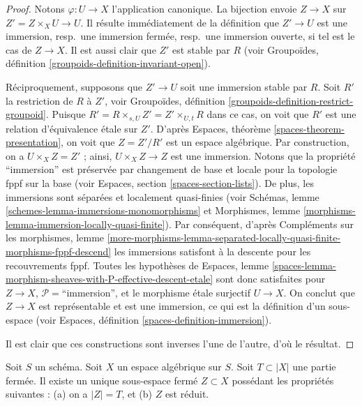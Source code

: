 \begin{proof}
Notons $\varphi : U \to X$ l'application canonique. La bijection envoie
$Z \to X$ sur $Z' = Z \times_X U \to U$. Il résulte immédiatement de la définition
que $Z' \to U$ est une immersion, resp.\ une immersion fermée, resp.\ une
immersion ouverte, si tel est le cas de $Z \to X$. Il est aussi clair que $Z'$ est stable par $R$
(voir Groupoïdes, définition \ref{groupoids-definition-invariant-open}).

\medskip\noindent
Réciproquement, supposons que $Z' \to U$ soit une immersion stable par $R$.
Soit $R'$ la restriction de $R$ à $Z'$, voir
Groupoïdes, définition \ref{groupoids-definition-restrict-groupoid}.
Puisque $R' = R \times_{s, U} Z' = Z' \times_{U, t} R$ dans ce cas,
on voit que $R'$ est une relation d'équivalence \'etale sur $Z'$. D'après
Espaces, théorème \ref{spaces-theorem-presentation}, on voit que
$Z = Z'/R'$ est un espace algébrique. Par construction, on a
$U \times_X Z = Z'$ ; ainsi, $U \times_X Z \to Z$ est une immersion.
Notons que la propriété ``immersion'' est préservée par changement de base
et locale pour la topologie fppf sur la base (voir Espaces, section \ref{spaces-section-lists}).
De plus, les immersions sont séparées et localement quasi-finies (voir
Schémas, lemme \ref{schemes-lemma-immersions-monomorphisms}
et
Morphismes, lemme \ref{morphisms-lemma-immersion-locally-quasi-finite}).
Par conséquent, d'après Compléments sur les morphismes, lemme
\ref{more-morphisms-lemma-separated-locally-quasi-finite-morphisms-fppf-descend}
les immersions satisfont à la descente pour les recouvrements fppf. Toutes les hypothèses de
Espaces,
lemme \ref{spaces-lemma-morphism-sheaves-with-P-effective-descent-etale}
sont donc satisfaites pour $Z \to X$, $\mathcal{P}=$``immersion'',
et le morphisme \'etale surjectif $U \to X$. On conclut que $Z \to X$
est représentable et est une immersion, ce qui est la
définition d'un sous-espace (voir
Espaces, définition \ref{spaces-definition-immersion}).

\medskip\noindent
Il est clair que ces constructions sont inverses l'une de l'autre, d'où le résultat.
\end{proof}

\begin{lemma}
\label{lemma-reduced-closed-subspace}
Soit $S$ un schéma.
Soit $X$ un espace algébrique sur $S$.
Soit $T \subset |X|$ une partie fermée.
Il existe un unique sous-espace fermé $Z \subset X$ possédant
les propriétés suivantes : (a) on a $|Z| = T$, et (b) $Z$ est réduit.
\end{lemma}

